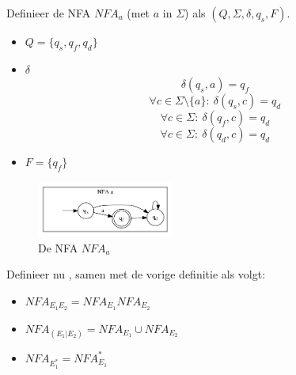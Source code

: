 \documentclass[main.tex]{subfiles}
\begin{document}
\begin{de}
  Definieer de NFA $NFA_{a}$ (met $a$ in $\Sigma$) als $(Q, \Sigma, \delta, q_{s}, F)$.

  \begin{itemize}
  \item $Q = \{q_{s},q_{f},q_{d}\}$
  \item $\delta$
    \[ \delta(q_{s}, a) = q_{f} \]
    \[ \forall c \in \Sigma\setminus\{a\}:\ \delta(q_{s}, c) = q_{d} \]
    \[ \forall c \in \Sigma:\ \delta(q_{f}, c) = q_{d}\]
    \[ \forall c \in \Sigma:\ \delta(q_{d}, c) = q_{d}\]
  \item $F = \{q_{f}\}$
  \end{itemize}

  \begin{figure}[H]
    \centering
    \includegraphics[width=0.4\textwidth]{assets/nfa_a.png}      
    \caption{De NFA $NFA_{a}$}
    \label{fig:nfa_a}
  \end{figure}
\end{de}

\begin{de}
  Definieer nu , samen met de vorige definitie als volgt:
  \begin{itemize}
  \item $NFA_{E_{1}E_{2}} = NFA_{E_{1}}NFA_{E_{2}}$
  \item $NFA_{(E_{1}|E_{2})} = NFA_{E_{1}} \cup NFA_{E_{2}}$
  \item $NFA_{E_{1}^{*}} = NFA_{E_{1}}^{*}$
  \end{itemize}
\end{de}
\end{document}

